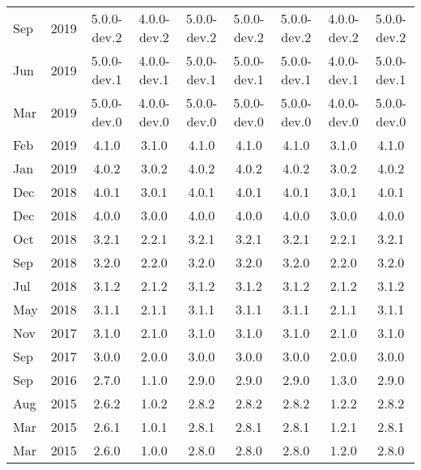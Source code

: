 \begin{xtabular}{|ll|c|c|c|c|c|c|c|}
Sep & 2019 & 5.0.0-dev.2 & 4.0.0-dev.2 & 5.0.0-dev.2 & 5.0.0-dev.2 & 5.0.0-dev.2 & 4.0.0-dev.2 & 5.0.0-dev.2 \\
Jun & 2019 & 5.0.0-dev.1 & 4.0.0-dev.1 & 5.0.0-dev.1 & 5.0.0-dev.1 & 5.0.0-dev.1 & 4.0.0-dev.1 & 5.0.0-dev.1 \\
Mar & 2019 & 5.0.0-dev.0 & 4.0.0-dev.0 & 5.0.0-dev.0   & 5.0.0-dev.0 & 5.0.0-dev.0 & 4.0.0-dev.0 & 5.0.0-dev.0\\
Feb & 2019 & 4.1.0       & 3.1.0       & 4.1.0         & 4.1.0       & 4.1.0       & 3.1.0       & 4.1.0\\
Jan & 2019 & 4.0.2       & 3.0.2       & 4.0.2         & 4.0.2       & 4.0.2       & 3.0.2       & 4.0.2\\
Dec & 2018 & 4.0.1       & 3.0.1       & 4.0.1         & 4.0.1       & 4.0.1       & 3.0.1       & 4.0.1\\
Dec & 2018 & 4.0.0       & 3.0.0       & 4.0.0         & 4.0.0       & 4.0.0       & 3.0.0       & 4.0.0\\
Oct & 2018 & 3.2.1       & 2.2.1       & 3.2.1         & 3.2.1       & 3.2.1       & 2.2.1       & 3.2.1\\
Sep & 2018 & 3.2.0       & 2.2.0       & 3.2.0         & 3.2.0       & 3.2.0       & 2.2.0       & 3.2.0\\
Jul & 2018 & 3.1.2       & 2.1.2       & 3.1.2         & 3.1.2       & 3.1.2       & 2.1.2       & 3.1.2\\
May & 2018 & 3.1.1       & 2.1.1       & 3.1.1         & 3.1.1       & 3.1.1       & 2.1.1       & 3.1.1\\
Nov & 2017 & 3.1.0       & 2.1.0       & 3.1.0         & 3.1.0       & 3.1.0       & 2.1.0       & 3.1.0\\
Sep & 2017 & 3.0.0       & 2.0.0       & 3.0.0         & 3.0.0       & 3.0.0       & 2.0.0       & 3.0.0\\
Sep & 2016 & 2.7.0       & 1.1.0       & 2.9.0         & 2.9.0       & 2.9.0       & 1.3.0       & 2.9.0\\
Aug & 2015 & 2.6.2       & 1.0.2       & 2.8.2         & 2.8.2       & 2.8.2       & 1.2.2       & 2.8.2\\
Mar & 2015 & 2.6.1       & 1.0.1       & 2.8.1         & 2.8.1       & 2.8.1       & 1.2.1       & 2.8.1\\
Mar & 2015 & 2.6.0       & 1.0.0       & 2.8.0         & 2.8.0       & 2.8.0       & 1.2.0       & 2.8.0\\

\end{xtabular}

